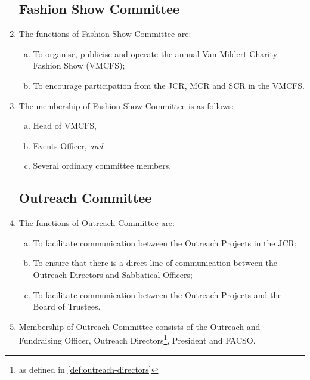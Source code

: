 \documentclass[12pt]{article}
\begin{document}
\begin{enumerate}
    \subsection{Fashion Show Committee}
    \item The functions of Fashion Show Committee are:
    \begin{enumerate}[(a)]
        \item To organise, publicise and operate the annual Van Mildert Charity Fashion Show (VMCFS);
        \item To encourage participation from the JCR, MCR and SCR in the VMCFS.
    \end{enumerate}
    \item The membership of Fashion Show Committee is as follows:
    \begin{enumerate}[(a)]
        \item Head of VMCFS,
        \item Events Officer, \emph{and}
        \item Several ordinary committee members.
    \end{enumerate}

    \subsection{Outreach Committee}
    \item The functions of Outreach Committee are:
    \begin{enumerate}[(a)]
        \item To facilitate communication between the Outreach Projects in the JCR;
        \item To ensure that there is a direct line of communication between the Outreach Directors and Sabbatical Officers;
        \item To facilitate communication between the Outreach Projects and the Board of Trustees.
    \end{enumerate}
    \item Membership of Outreach Committee consists of the Outreach and Fundraising Officer, Outreach Directors\footnote{as defined in \ref{def:outreach-directors}}, President and FACSO.


\end{enumerate}
\end{document}
